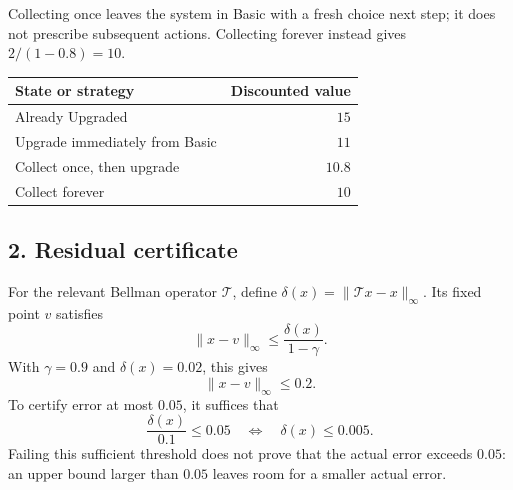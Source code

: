\documentclass[11pt]{article}
\theoremstyle{remark}\newtheorem{remark}[definition]{Remark}
\begin{document}
Collecting once leaves the system in Basic with a fresh choice next step; it does not prescribe subsequent actions. Collecting forever instead gives $2/(1-0.8)=10$.
\begin{center}
\begin{tabular}{lr}\toprule
State or strategy & Discounted value\\\midrule
Already Upgraded & $15$\\
Upgrade immediately from Basic & $11$\\
Collect once, then upgrade & $10.8$\\
Collect forever & $10$\\\bottomrule
\end{tabular}
\end{center}

\subsection*{2. Residual certificate}
For the relevant Bellman operator $\mathcal T$, define
$\delta(x)=\|\mathcal T x-x\|_\infty$. Its fixed point $v$ satisfies
\[
\|x-v\|_\infty\le\frac{\delta(x)}{1-\gamma}.
\]
With $\gamma=0.9$ and $\delta(x)=0.02$, this gives
\[
\boxed{\|x-v\|_\infty\le0.2.}
\]
To certify error at most $0.05$, it suffices that
\[
\frac{\delta(x)}{0.1}\le0.05
\quad\Longleftrightarrow\quad\boxed{\delta(x)\le0.005.}
\]
Failing this sufficient threshold does not prove that the actual error exceeds $0.05$: an upper bound larger than $0.05$ leaves room for a smaller actual error.

\clearpage
\end{document}
